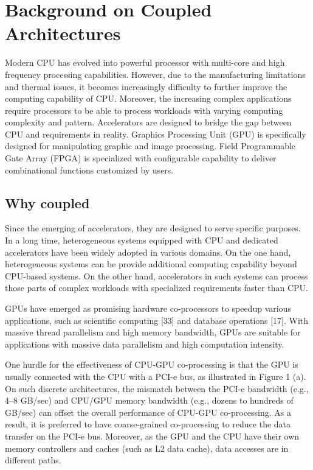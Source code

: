 \section{Background on Coupled Architectures} \label{sec:background}
Modern CPU has evolved into powerful processor with multi-core and high frequency processing capabilities. However, due to the manufacturing limitations and thermal issues, it becomes increasingly difficulty to further improve the computing capability of CPU. Moreover, the increasing complex applications require processors to be able to process workloads with varying computing complexity and pattern. Accelerators are designed to bridge the gap between CPU and requirements in reality. Graphics Processing Unit (GPU) is specifically designed for manipulating graphic and image processing. Field Programmable Gate Array (FPGA) is specialized with configurable capability to deliver combinational functions customized by users.

\subsection{Why coupled}
Since the emerging of accelerators, they are designed to serve specific purposes. In a long time, heterogeneous systems equipped with CPU and dedicated accelerators have been widely adopted in various domains. On the one hand, heterogeneous systems can be provide additional computing capability beyond CPU-based systems. On the other hand, accelerators in such systems can process those parts of complex workloads with specialized requirements faster than CPU.

GPUs have emerged as promising hardware co-processors to speedup various applications, such as scientific computing [33] and database operations [17]. With massive thread parallelism and high memory bandwidth, GPUs are suitable for applications with massive data parallelism and high computation intensity.

One hurdle for the effectiveness of CPU-GPU co-processing is that the GPU is usually connected with the CPU with a PCI-e bus, as illustrated in Figure 1 (a). On such discrete architectures, the mismatch between the PCI-e bandwidth (e.g., 4–8 GB/sec) and CPU/GPU memory bandwidth (e.g., dozens to hundreds of GB/sec) can offset the overall performance of CPU-GPU co-processing. As a result, it is preferred to have coarse-grained co-processing to reduce the data transfer on the PCI-e bus. Moreover, as the GPU and the CPU have their own memory controllers and caches (such as L2 data cache), data accesses are in different paths.

